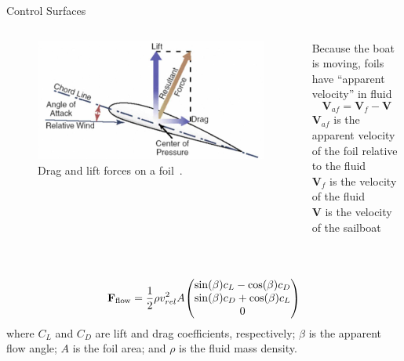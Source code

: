 \documentclass[10pt,xcolor={table,dvipsnames},t]{beamer}
\begin{document}
\begin{frame}{Control Surfaces}

\begin{columns}
\begin{figure}
    \centering
    \includegraphics[width = \linewidth]{documents/figures/alves_wing.png}
    \caption{Drag and lift forces on a foil~\cite{Alves2010}.}
    \label{fig:alves_foil}
\end{figure}




Because the boat is moving, foils have \enquote{apparent velocity} in fluid\\\textbf{}
\begin{equation}
    \mathbf{V}_{af} = \mathbf{V}_f - \mathbf{V}
\end{equation}
\(\mathbf{V}_{af}\) is the apparent velocity of the foil relative to the fluid\\
\(\mathbf{V}_{f}\) is the velocity of the fluid\\
\(\mathbf{V}\) is the velocity of the sailboat
\end{columns}
\hfill{} \\
\begin{equation}
    \mathbf{F}_{\mathrm{flow}} = \frac{1}{2} \rho v_{rel}^2 A \mqty(\sin(\beta) c_L - \cos(\beta) c_D \\ \sin(\beta) c_D + \cos(\beta) c_L\\ 0)
\end{equation}
where \(C_L\) and \(C_D\) are lift and drag coefficients, respectively; \(\beta\) is the apparent flow angle; \(A\) is the foil area; and \(\rho\) is the fluid mass density.
\end{frame}
\end{document}
